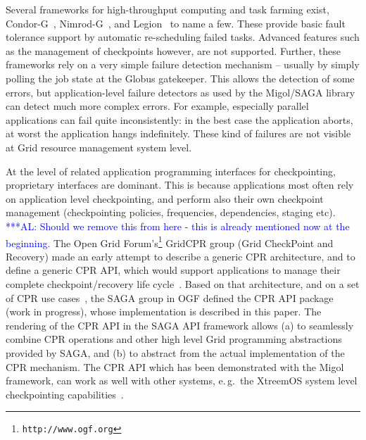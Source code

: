 \documentclass{rspublic}
\newcommand{\alnote}[1]{ {\textcolor{blue} { ***AL: #1 }}}
\newcommand{\alnote}[1]{}
\begin{document}
 Several frameworks for
high-throughput computing and task farming exist,
Condor-G~\cite{citeulike:291860}, Nimrod-G~\cite{buyya00nimrodg}, and
Legion~\cite{689541} to name a few. These provide basic fault
tolerance support by automatic re-scheduling failed tasks. Advanced
features such as the management of checkpoints however, are not
supported. Further, these frameworks rely on a very simple failure
detection mechanism -- usually by simply polling the job state at the
Globus gatekeeper. This allows the detection of some errors, but
application-level failure detectors as used by the Migol/SAGA library
can detect much more complex errors. For example, especially parallel
applications can fail quite inconsistently: in the best case the
application aborts, at worst the application hangs indefinitely. These
kind of failures are not visible at Grid resource management system
level.

At the level of related application programming interfaces for
checkpointing, proprietary interfaces are dominant. This is because
applications most often rely on application level checkpointing, and
perform also their own checkpoint management (checkpointing policies,
frequencies, dependencies, staging etc).  \alnote{Should we remove
  this from here - this is already mentioned now at the beginning.}
The Open Grid Forum's\footnote{\texttt{http://www.ogf.org}} GridCPR
group (Grid CheckPoint and Recovery) made an early attempt to describe
a generic CPR architecture, and to define a generic CPR API, which
would support applications to manage their complete
checkpoint/recovery life cycle~\cite{ogf_cpr_arch}.  Based on that
architecture, and on a set of CPR use cases~\cite{ogf_cpr_uc}, the
SAGA group in OGF defined the CPR API package~\cite{saga_cpr_draft}
(work in progress), whose implementation is described in this paper.
The rendering of the CPR API in the SAGA API framework allows (a) to
seamlessly combine CPR operations and other high level Grid
programming abstractions provided by SAGA, and (b) to abstract from
the actual implementation of the CPR mechanism.  The CPR API which has
been demonstrated with the Migol framework, can work as well with
other systems, e.\,g.\, the XtreemOS system level checkpointing
capabilities~\cite{xtreemos_cpr}.
\end{document}
